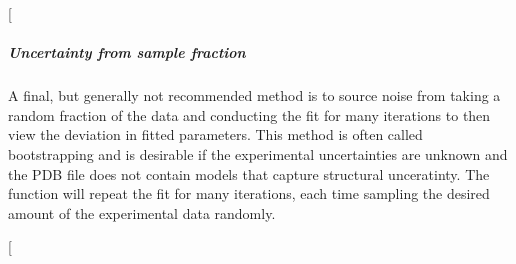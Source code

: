 \documentclass[a4paper,10pt,english,openany,oneside]{sphinxmanual}
\begin{document}
 {[}\sphinxcode{\sphinxupquote{monte\_carlo.png}}{]}

\noindent{}


\subparagraph{Uncertainty from sample fraction}
\label{\detokenize{examples/pcs_fit_uncertainty:uncertainty-from-sample-fraction}}
A final, but generally not recommended method is to source noise from taking a random fraction of the data and conducting the fit for many iterations to then view the deviation in fitted parameters. This method is often called bootstrapping and is desirable if the experimental uncertainties are unknown and the PDB file does not contain models that capture structural unceratinty. The function {\hyperref[\detokenize{reference/generated/paramagpy.fit.fit_error_bootstrap:paramagpy.fit.fit_error_bootstrap}]{}} will repeat the fit for many iterations, each time sampling the desired amount of the experimental data randomly.

%
\begin{sphinxVerbatim}[commandchars=\\\{\}]
\PYG{p}{[}\PYG{p}{]} \PYG{p}{[}\PYG{p}{]}   
	  \PYG{p}{[}\PYG{p}{]} \PYG{p}{[}\PYG{p}{]}

\end{sphinxVerbatim}

 {[}\sphinxcode{\sphinxupquote{error\_tensor\_bootstrap.txt}}{]}
\end{document}
